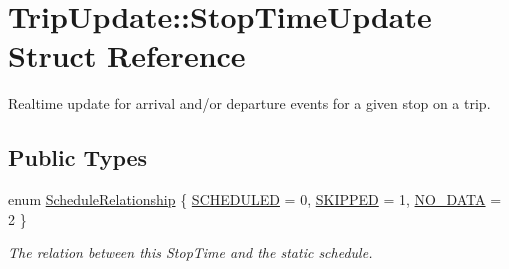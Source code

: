\hypertarget{structTripUpdate_1_1StopTimeUpdate}{}\section{Trip\+Update\+:\+:Stop\+Time\+Update Struct Reference}
\label{structTripUpdate_1_1StopTimeUpdate}


Realtime update for arrival and/or departure events for a given stop on a trip.  


\subsection*{Public Types}
\begin{DoxyCompactItemize}
\item 
enum \hyperlink{structTripUpdate_1_1StopTimeUpdate_a624ef1349bfc24a44984c33761070726}{Schedule\+Relationship} \{ \hyperlink{structTripUpdate_1_1StopTimeUpdate_a624ef1349bfc24a44984c33761070726ad2bf6182562045f8d4494f2b90979475}{S\+C\+H\+E\+D\+U\+L\+ED} = 0, 
\hyperlink{structTripUpdate_1_1StopTimeUpdate_a624ef1349bfc24a44984c33761070726a7b42e54cedaee1689c090fddce6ffe3e}{S\+K\+I\+P\+P\+ED} = 1, 
\hyperlink{structTripUpdate_1_1StopTimeUpdate_a624ef1349bfc24a44984c33761070726a9c4ab18a54e2c8f3c235f0cdaa3382bc}{N\+O\+\_\+\+D\+A\+TA} = 2
 \}\begin{DoxyCompactList}\small\item\em The relation between this Stop\+Time and the static schedule. \end{DoxyCompactList}
\end{DoxyCompactItemize}
